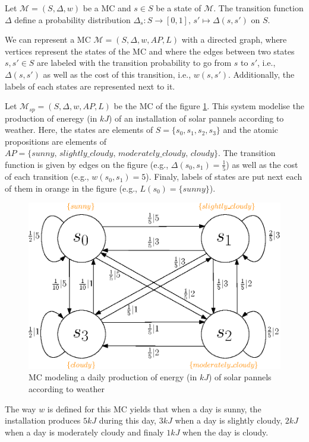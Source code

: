 \begin{property}
  Let $\mathcal{M} = (S, \Delta, w)$ be a MC and $s \in S$ be a state of $\mathcal{M}$. The transition function $\Delta$ define a probability distribution $\Delta_s : S \rightarrow [0, 1], \, s' \mapsto \Delta(s, s')$ on $S$.
\end{property}

We can represent a MC $\mathcal{M} = (S, \Delta, w, AP, L)$ with a directed graph, where vertices represent the states
of the MC and where the edges between two states $s, s' \in S$ are labeled with the transition probability to go from $s$ to $s'$, i.e., $\Delta(s, s')$ as well as the cost of this transition, i.e., $w(s, s')$. Additionally, the labels of each
states are represented next to it.

\begin{example}
  Let $\mathcal{M}_{sp} = (S, \Delta, w, AP, L)$ be the MC of the figure \ref{MCexample}. This system modelise the production of eneregy (in $kJ$) of
  an installation of solar pannels according to weather.
  Here, the states are elements of $S = \{s_0, s_1, s_2, s_3\}$ and the atomic propositions are elements of $AP = \{sunny, \, slightly\_cloudy, \, moderately\_cloudy, \, cloudy \}$. The transition function is given by edges on the figure (e.g., $\Delta(s_0, s_1) = \frac{1}{5}$) as well as the
  cost of each transition (e.g., $w(s_0, s_1) = 5$). Finaly, labels of states
  are put next each of them in orange in the figure (e.g., $L(s_0) = \{sunny\}$).
  \begin{figure}[h!]
    \centering
    \includegraphics[width=0.6\linewidth]{resources/weather-solar-pannel}
    \caption{MC modeling a daily production of energy (in $kJ$) of solar pannels according to weather}
    \label{MCexample}
  \end{figure}
  The way $w$ is defined for this MC yields that when a day is sunny, the installation produces $5 kJ$ during this day, $3 kJ$ when a day is slightly cloudy, $2 kJ$ when a day is moderately cloudy and finaly $1 kJ$ when the day is cloudy.
\end{example}
